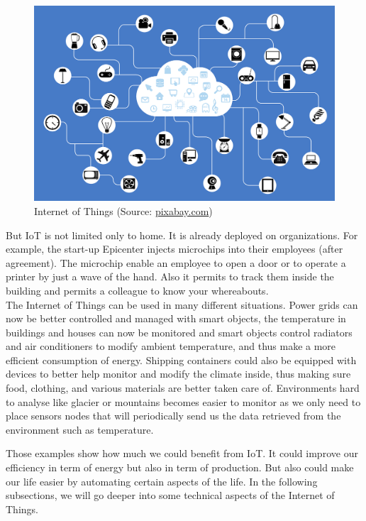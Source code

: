 \begin{figure}
  \centering
  \includegraphics[width=\textwidth]{res/iot.png}
  \caption{Internet of Things (Source: \url{pixabay.com})}
  \label{fig:iot}
\end{figure}

But IoT is not limited only to home. It is already deployed on organizations. For example, the start-up Epicenter injects microchips into their employees (after agreement)\cite{website:lat_04_17}. The microchip enable an employee to open a door or to operate a printer by just a wave of the hand. Also it permits to track them inside the building and permits a colleague to know your whereabouts. \\

The Internet of Things can be used in many different situations. Power grids can now be better controlled and managed with smart objects, the temperature in buildings and houses can now be monitored and smart objects control radiators and air conditioners to modify ambient temperature, and thus make a more efficient consumption of energy. Shipping containers could also be equipped with devices to better help monitor and modify the climate inside, thus making sure food, clothing, and various materials are better taken care of. Environments hard to analyse like glacier or mountains becomes easier to monitor as we only need to place sensors nodes that will periodically send us the data retrieved from the environment such as temperature. \\


Those examples show how much we could benefit from IoT. It could improve our efficiency in term of energy but also in term of production. But also could make our life easier by automating certain aspects of the life. In the following subsections, we will go deeper into some technical aspects of the Internet of Things. \\

